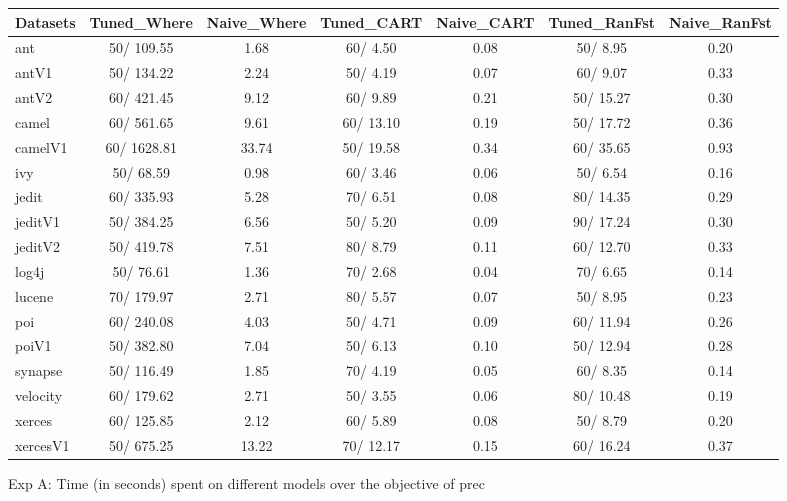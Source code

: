 \documentclass{acm_proc_article-sp}
\begin{document}
\begin{figure*}[!ht]
\scriptsize
\centering
  \begin{tabular}{l|c |c |c |c |c |c }
    \hline\hline
    Datasets & Tuned\_Where & Naive\_Where & Tuned\_CART & Naive\_CART & Tuned\_RanFst & Naive\_RanFst\\
    \hline
    ant & 50/ 109.55 & 1.68 & 60/ 4.50 & 0.08 & 50/ 8.95 & 0.20\\
    antV1 & 50/ 134.22 & 2.24 & 50/ 4.19 & 0.07 & 60/ 9.07 & 0.33\\
    antV2 & 60/ 421.45 & 9.12 & 60/ 9.89 & 0.21 & 50/ 15.27 & 0.30\\
    camel & 60/ 561.65 & 9.61 & 60/ 13.10 & 0.19 & 50/ 17.72 & 0.36\\
    camelV1 & 60/ 1628.81 & 33.74 & 50/ 19.58 & 0.34 & 60/ 35.65 & 0.93\\
    ivy & 50/ 68.59 & 0.98 & 60/ 3.46 & 0.06 & 50/ 6.54 & 0.16\\
    jedit & 60/ 335.93 & 5.28 & 70/ 6.51 & 0.08 & 80/ 14.35 & 0.29\\
    jeditV1 & 50/ 384.25 & 6.56 & 50/ 5.20 & 0.09 & 90/ 17.24 & 0.30\\
    jeditV2 & 50/ 419.78 & 7.51 & 80/ 8.79 & 0.11 & 60/ 12.70 & 0.33\\
    log4j & 50/ 76.61 & 1.36 & 70/ 2.68 & 0.04 & 70/ 6.65 & 0.14\\
    lucene & 70/ 179.97 & 2.71 & 80/ 5.57 & 0.07 & 50/ 8.95 & 0.23\\
    poi & 60/ 240.08 & 4.03 & 50/ 4.71 & 0.09 & 60/ 11.94 & 0.26\\
    poiV1 & 50/ 382.80 & 7.04 & 50/ 6.13 & 0.10 & 50/ 12.94 & 0.28\\
    synapse & 50/ 116.49 & 1.85 & 70/ 4.19 & 0.05 & 60/ 8.35 & 0.14\\
    velocity & 60/ 179.62 & 2.71 & 50/ 3.55 & 0.06 & 80/ 10.48 & 0.19\\
    xerces & 60/ 125.85 & 2.12 & 60/ 5.89 & 0.08 & 50/ 8.79 & 0.20\\
    xercesV1 & 50/ 675.25 & 13.22 & 70/ 12.17 & 0.15 & 60/ 16.24 & 0.37\\
  \end{tabular}
  \caption{ Exp A: Time (in seconds) spent on different models over the objective of prec}
\end{figure*}
\end{document}

